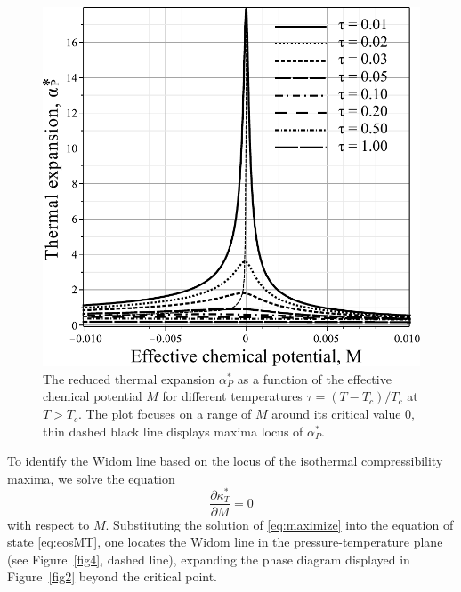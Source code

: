 \begin{figure}[h!] 
	\centering \includegraphics[width=\column]{f3cc.pdf}
	\vskip-3mm
	\caption{The reduced thermal expansion $\alpha^*_P$ as a function of the effective chemical potential $M$ for different temperatures $\tau = (T - T_c)/T_c$ at $T > T_c$. The plot focuses on a range of $M$ around its critical value $0$, thin dashed black line displays maxima locus of $\alpha^*_P$.
	}
	\label{fig3b}
\end{figure}
To identify the Widom line based on the locus of the isothermal compressibility maxima, we solve the equation
\begin{equation}\label{eq:maximize}
	\frac{\partial \kappa_T^*}{\partial M} = 0
\end{equation}
with respect to $M$.
Substituting the solution of \eqref{eq:maximize} into the equation of state \eqref{eq:eosMT}, one locates the Widom line in the pressure-temperature plane (see Figure~\ref{fig4}, dashed line), expanding the phase diagram displayed in Figure~\ref{fig2} beyond the critical point.

